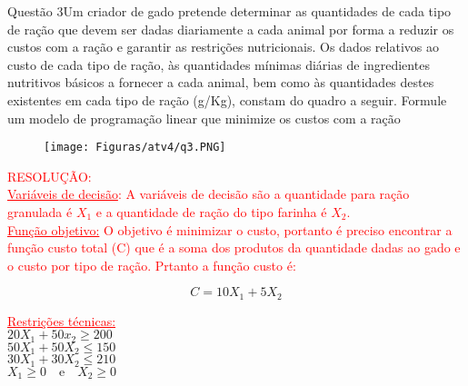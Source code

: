 \documentclass[12pt]{article}
\begin{document}
\begin{section}{Questão 3}{Um criador de gado pretende determinar as quantidades de cada tipo de ração que devem ser
dadas diariamente a cada animal por forma a reduzir os custos com a ração e garantir as restrições nutricionais. Os dados relativos ao custo de cada tipo de ração, às quantidades mínimas diárias de ingredientes nutritivos básicos a fornecer a cada animal, bem como às quantidades destes existentes em cada tipo de ração (g/Kg), constam do quadro a seguir. Formule um modelo de programação linear que minimize os custos com a ração}

\begin{figure}[H]
    \centering
    \texttt{[image: Figuras/atv4/q3.PNG]}
\end{figure}

\noindent \textcolor{red}{RESOLUÇÃO:}\\

\noindent \textcolor{red}{\underline{Variáveis de decisão}: A variáveis de decisão são a quantidade para ração granulada é $X_1$ e a quantidade de ração do tipo farinha é $X_2$.}\\

\noindent \textcolor{red}{\underline{Função objetivo:} O objetivo é minimizar o custo, portanto é preciso encontrar a função custo total (C) que é a soma dos produtos da quantidade dadas ao gado e o custo por tipo de ração. Prtanto a função custo é:}

$$
    C = 10X_{1} + 5X_{2}
$$

\noindent \textcolor{red}{\underline{Restrições técnicas:}}\\

\noindent $20X_{1} + 50x_{2} \geq 200$\\
$50X_{1} + 50X_{2} \leq 150$\\
$30X_{1} + 30X_{2} \leq 210$\\
$X_{1} \geq 0 \quad \text{e} \quad X_{2} \geq 0$

\end{section}
\newpage
\end{document}
